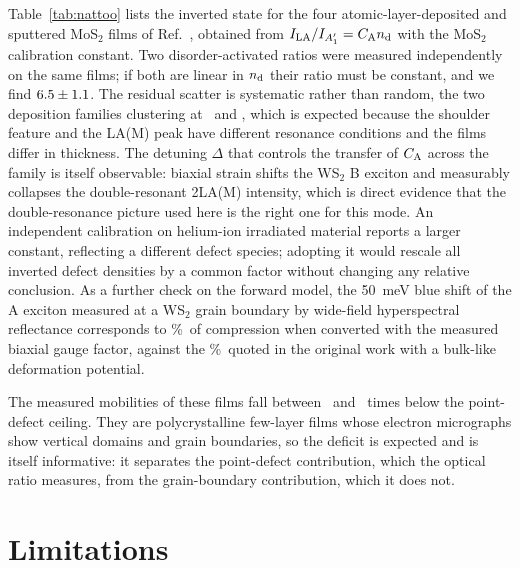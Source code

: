 \documentclass[aip,apl,amsmath,amssymb,reprint,longbibliography]{revtex4-1}
\begin{document}
Table~\ref{tab:nattoo} lists the inverted state for the four
atomic-layer-deposited and sputtered MoS$_2$ films of
Ref.~, obtained from
$I_{\rm LA}/I_{A_1'}=C_{\rm A}n_{\rm d}$ with the MoS$_2$ calibration
constant.\cite{Mignuzzi2015} Two disorder-activated ratios were measured
independently on the same films; if both are linear in $n_{\rm d}$ their ratio
must be constant, and we find $6.5\pm1.1$. The residual
scatter is systematic rather than random, the two deposition families
clustering at \NattooRatioALD\ and \NattooRatioSputt, which is expected
because the shoulder feature and the LA(M) peak have different resonance
conditions and the films differ in thickness. The detuning $\Delta$ that controls the transfer of $C_{\rm A}$ across the
family is itself observable: biaxial strain shifts the WS$_2$ B exciton and
measurably collapses the double-resonant 2LA(M) intensity, which is direct
evidence that the double-resonance picture used here is the right one for this
mode.\cite{Rodriguez2026} An independent calibration on
helium-ion irradiated material reports a larger
constant,\cite{Aryeetey2020} reflecting a different defect species; adopting
it would rescale all inverted defect densities by a common factor without
changing any relative conclusion. As a further check on the forward model, the
50~meV blue shift of the A exciton measured at a WS$_2$ grain boundary by
wide-field hyperspectral reflectance\cite{Peng2026} corresponds to
\GBstrain\%\ of compression when converted with the measured biaxial gauge
factor,\cite{Henriquez2023} against the \GBstrainRef\%\ quoted in the
original work with a bulk-like deformation potential.

The measured mobilities of these films fall between \DeficitLo\ and
\DeficitHi\ times below the point-defect ceiling. They are polycrystalline few-layer films whose electron
micrographs show vertical domains and grain
boundaries,\cite{Nattoo2025,vanderZande2013} so the deficit is expected and is
itself informative: it separates the point-defect contribution, which the
optical ratio measures, from the grain-boundary contribution, which it does
not.

\section{Limitations}
\end{document}
